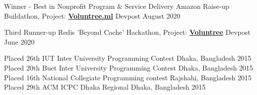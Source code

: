 \begin{cvhonors}
  \cvhonor
    {Winner - Best in Nonprofit Program \& Service Delivery}
    {Amazon Raise-up Buildathon, Project: \href{https://devpost.com/software/voluntree-ml}{\bodyfont\bfseries{Voluntree.ml}}}
    {Devpost}
    {August 2020}
\end{cvhonors}
\begin{cvhonors}
  \cvhonor
    {Third Runner-up}
    {Redis 'Beyond Cache' Hackathon, Project: \href{https://devpost.com/software/voluntree-3uwf9h}{\bodyfont\bfseries{Voluntree}}}
    {Devpost}
    {June 2020}
\end{cvhonors}

\begin{cvhonors}
  \cvhonor
    {Placed 26th}
    {IUT Inter University Programming Contest}
    {Dhaka, Bangladesh}
    {2015}
  \cvhonor
    {Placed 20th}
    {Buet Inter University Programming Contest}
    {Dhaka, Bangladesh}
    {2015}
  \cvhonor
    {Placed 16th}
    {National Collegiate Programming contest}
    {Rajshahi, Bangladesh}
    {2015}
  \cvhonor
    {Placed 29th}
    {ACM ICPC Dhaka Regional}
    {Dhaka, Bangladesh}
    {2015}
\end{cvhonors}

  \vspace{-8mm}
  \begin{cvitems}
    \item { }
    \item { }
    \item { }
    \item { }
  \end{cvitems}
